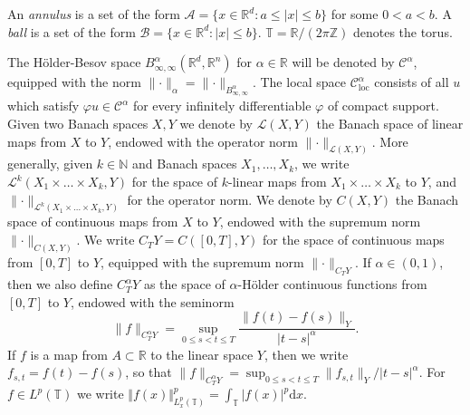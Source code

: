 \documentclass[11pt,a4paper]{article}
\newcommand{\cdummy}{\cdot}
\newcommand{\mathd}{\mathrm{d}}
\newcommand{\tmem}[1]{{\em #1\/}}
\newcommand{\tmtextit}[1]{{\itshape{#1}}}
\theoremstyle{remark}
\newcommand{\R}{\mathbb{R}}
\newcommand{\Z}{\mathbb{Z}}
\newcommand{\Lcal}{\mathcal{L}}
\newcommand{\CA}{\ensuremath{\mathscr{A}}}
\newcommand{\CB}{\ensuremath{\mathscr{B}}}
\newcommand{\CC}{\ensuremath{\mathscr{C}}}
\begin{document}
An \tmtextit{annulus} is a set of the form $\CA = \{ x \in \mathbb{R}^{d} :a \leqslant | x | \leqslant b \}$ for some $0<a<b$. A {\tmem{ball}} is a set of the form $\CB = \{ x \in \mathbb{R}^{d} : | x | \leqslant b \}$. $\mathbb{T}= \R / (2\pi \Z)$ denotes the torus.

The H\"older-Besov space $B^\alpha_{\infty, \infty}(\R^d, \R^n)$ for $\alpha \in \R$ will be denoted by $\CC^\alpha$, equipped with the norm $\lVert \cdot \rVert_{\alpha}= \lVert \cdot \rVert_{B^\alpha_{\infty,\infty}}$. The local space $\CC^\alpha_\mathrm{loc}$ consists of all $u$ which satisfy $\varphi u \in \CC^\alpha$ for every infinitely differentiable $\varphi$ of compact support. Given two Banach spaces $X,Y$ we denote by $\Lcal ( X,Y )$ the Banach space of linear maps from $X$ to $Y$, endowed with the operator norm $\lVert \cdummy \rVert_{\Lcal(X,Y)}$. More generally, given $k \in \mathbb{N}$ and Banach spaces $X_{1} , \ldots ,X_{k}$, we write $\Lcal^{k} ( X_{1}\times \ldots \times X_{k} ,Y )$ for the space of $k$-linear maps from $X_{1} \times \ldots \times X_{k}$ to $Y$, and $\lVert \cdummy \rVert_{\Lcal^{k} (X_{1} \times \ldots \times X_{k} ,Y )}$ for the operator norm. We denote by $C( X,Y )$ the Banach space of continuous maps from $X$ to $Y$, endowed with the supremum norm $\lVert \cdummy \rVert_{C ( X,Y )}$. We write $C_{T} Y=C ( [ 0,T ] ,Y )$ for the space of continuous maps from $[ 0,T ]$ to $Y$, equipped with the supremum norm $\lVert \cdummy \rVert_{C_{T} Y}$. If $\alpha \in ( 0,1 )$, then we also define $C^{\alpha}_{T} Y$ as the space of $\alpha$-H{\"o}lder continuous functions from $[ 0,T ]$ to $Y$, endowed with the seminorm
\[
   \| f \|_{C^{\alpha}_{T} Y} = \sup_{0 \leqslant s<t \leqslant T} \frac{\| f( t ) -f ( s ) \|_{Y}}{| t-s |^{\alpha}}.
\]
If $f$ is a map from $A \subset \R$ to the linear space $Y$, then we write $f_{s,t} = f(t) - f(s)$, so that $\| f \|_{C^\alpha_T Y} = \sup_{0 \leqslant s<t \leqslant T} \| f_{s,t} \|_{Y}/ | t-s |^{\alpha}$. For  $f \in L^p(\mathbb{T})$ we write $\Vert  f(x) \Vert ^p_{L^p_x (\mathbb{T} )} = \int_{\mathbb{T}} | f ( x )|^p \mathd x$.
\end{document}
